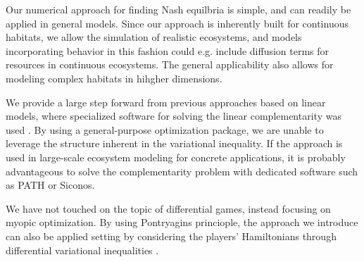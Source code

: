 Our numerical approach for finding Nash equilbria is simple, and can readily be applied in general models. Since our approach is inherently built for continuous habitats, we allow the simulation of realistic ecosystems, and models incorporating behavior in this fashion could e.g. include diffusion terms for resources in continuous ecosystems. The general applicability also allows for modeling complex habitats in hihgher dimensions.

We provide a large step forward from previous approaches based on linear models, where specialized software for solving the linear complementarity was used \citep{patrizio}. By using a general-purpose optimization package, we are unable to leverage the structure inherent in the variational inequality. If the approach is used in large-scale ecosystem modeling for concrete applications, it is probably advantageous to solve the complementarity problem with dedicated software such as PATH or Siconos.

We have not touched on the topic of differential games, instead focusing on myopic optimization. By using Pontryagins princiople, the approach we introduce can also be applied setting by considering the players' Hamiltonians through differential variational inequalities \citep{pangstewart2008}.




